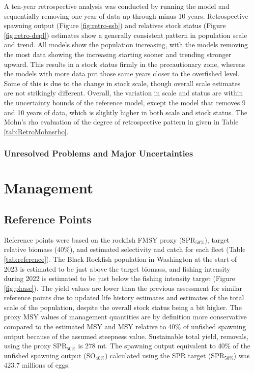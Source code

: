 \documentclass[11pt,
  english,
  letterpaper,
]{article}
\begin{document}
A ten-year retrospective analysis was conducted by running the model and sequentially removing one year of data up through minus 10 years. Retrospective spawning output (Figure \ref{fig:retro-ssb}) and relatives stock status (Figure \ref{fig:retro-depl}) estimates show a generally consistent pattern in population scale and trend. All models show the population increasing, with the models removing the most data showing the increasing starting sooner and trending stronger upward. This results in a stock status firmly in the precautionary zone, whereas the models with more data put those same years closer to the overfished level. Some of this is due to the change in stock scale, though overall scale estimates are not strikingly different. Overall, the variation in scale and status are within the uncertainty bounds of the reference model, except the model that removes 9 and 10 years of data, which is slightly higher in both scale and stock status. The Mohn's rho evaluation of the degree of retrospective pattern in given in Table \ref{tab:RetroMohnsrho}.

\hypertarget{unresolved-problems-and-major-uncertainties-1}{%
\subsubsection{Unresolved Problems and Major Uncertainties}\label{unresolved-problems-and-major-uncertainties-1}}

\hypertarget{management}{%
\section{Management}\label{management}}

\hypertarget{reference-points-1}{%
\subsection{Reference Points}\label{reference-points-1}}

Reference points were based on the rockfish FMSY proxy (\(\text{SPR}_{50\%}\)), target relative biomass (40\%), and estimated selectivity and catch for each fleet (Table \ref{tab:reference}). The Black Rockfish population in Washington at the start of 2023 is estimated to be just above the target biomass, and fishing intensity during 2022 is estimated to be just below the fishing intensity target (Figure \ref{fig:phase}). The yield values are lower than the previous assessment for similar reference points due to updated life history estimates and estimates of the total scale of the population, despite the overall stock status being a bit higher. The proxy MSY values of management quantities are by definition more conservative compared to the estimated MSY and MSY relative to 40\% of unfished spawning output because of the assumed steepness value. Sustainable total yield, removals, using the proxy \(\text{SPR}_{50\%}\) is 278 mt. The spawning output equivalent to 40\% of the unfished spawning output (\(\text{SO}_{40\%}\)) calculated using the SPR target (\(\text{SPR}_{50\%}\)) was 423.7 millions of eggs.
\end{document}
